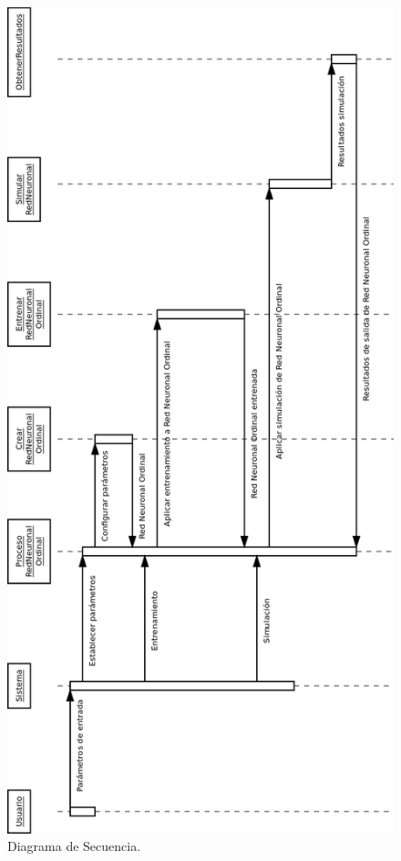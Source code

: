 			\begin{figure}[h]
				\centering
				\includegraphics[scale=0.5]{uml/DiagramaSecuencia.png}
				\caption{Diagrama de Secuencia.}
				\label{fig:secuencia}
			\end{figure}
